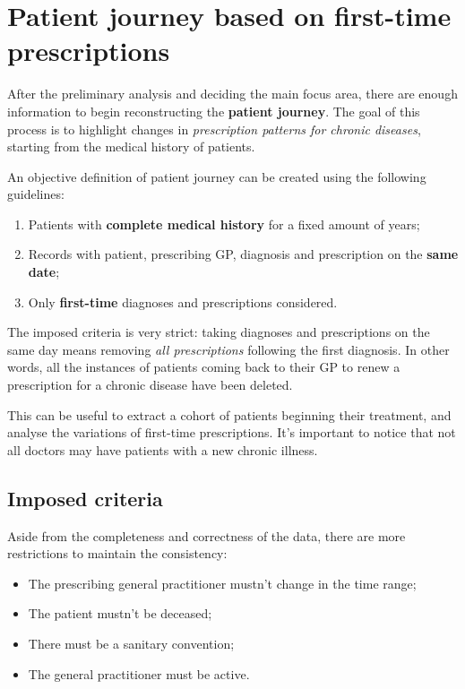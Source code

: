 \chapter[Patient journey - 1]{Patient journey based on first-time prescriptions}
After the preliminary analysis and deciding the main focus area, there are enough information to begin reconstructing the \textbf{patient journey}. The goal of this process is to highlight changes in \textit{prescription patterns for chronic diseases}, starting from the medical history of patients.

An objective definition of patient journey can be created using the following guidelines:
\begin{enumerate}
	\item Patients with \textbf{complete medical history} for a fixed amount of years;
	\item Records with patient, prescribing GP, diagnosis and prescription on the \textbf{same date};
	\item Only \textbf{first-time }diagnoses and prescriptions considered.
\end{enumerate}

The imposed criteria is very strict: taking diagnoses and prescriptions on the same day means removing \textit{all prescriptions} following the first diagnosis. In other words, all the instances of patients coming back to their GP to renew a prescription for a chronic disease have been deleted.

This can be useful to extract a cohort of patients beginning their treatment, and analyse the variations of first-time prescriptions. It's important to notice that not all doctors may have patients with a new chronic illness.

\section{Imposed criteria}
Aside from the completeness and correctness of the data, there are more restrictions to maintain the consistency:
\begin{itemize}
	\item The prescribing general practitioner mustn't change in the time range;
	\item The patient mustn't be deceased;
	\item There must be a sanitary convention;
	\item The general practitioner must be active.
\end{itemize}

